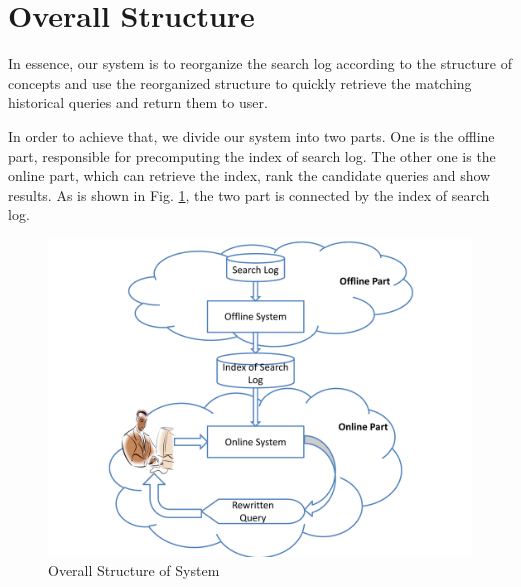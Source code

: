 \section{Overall Structure}
In essence, our system is to reorganize the search log according to the structure of concepts and use the reorganized
structure to quickly retrieve the matching historical queries and return them to user.

In order to achieve that, we divide our system into two parts. One is the offline part, responsible for precomputing the
index of search log. The other one is the online part, which can retrieve the index, rank the candidate queries and show
 results. As is shown in Fig. \ref{fig:overall-structure}, the two part is connected by the index of search log.

\begin{figure}[h]
\centering
\includegraphics[scale=0.3]{images/overall}
\caption{Overall Structure of System}
\label{fig:overall-structure}
\end{figure}